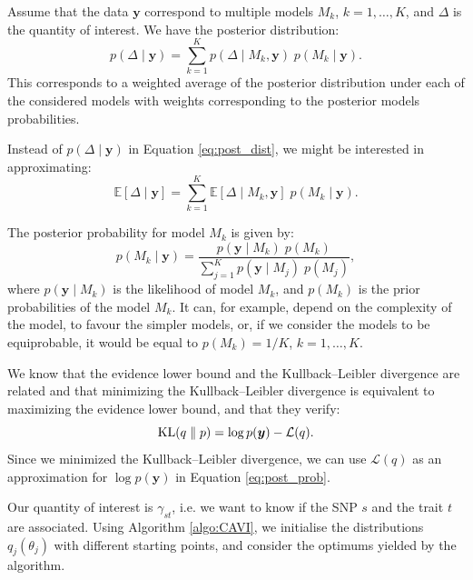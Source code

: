 \documentclass[a4paper, 11pt]{report}
\numberwithin{equation}{chapter}
\DeclareMathOperator*{\KL}{{\rm KL}}
\begin{document}
Assume that the data $\boldsymbol{y}$ correspond to multiple models $M_k$, $k= 1,\ldots,K$, and $\Delta$ is the quantity of interest. We have the posterior distribution:
\begin{equation}
p(\Delta \mid \boldsymbol{y}) = \sum_{k=1}^K p(\Delta \mid M_k,\boldsymbol{y}) \; p(M_k \mid \boldsymbol{y}).
\label{eq:post_dist}
\end{equation}
This corresponds to a weighted average of the posterior distribution under each of the considered models with weights corresponding to the posterior models probabilities.

Instead of $p(\Delta \mid \boldsymbol{y})$ in Equation \ref{eq:post_dist}, we might be interested in approximating:
\begin{equation*}
\mathbb{E}\left[\Delta \mid \boldsymbol{y}\right] = \sum_{k=1}^K\mathbb{E}\left[\Delta \mid M_k, \boldsymbol{y}\right]\;p(M_k \mid \boldsymbol{y}).
\end{equation*}

The posterior probability for model $M_k$ is given by:
\begin{equation}
p(M_k \mid \boldsymbol{y}) = \frac{p(\boldsymbol{y} \mid M_k)\; p(M_k)}{\sum_{j=1}^K p(\boldsymbol{y} \mid M_j)\; p(M_j)},
\label{eq:post_prob}
\end{equation}
where $p(\boldsymbol{y} \mid M_k)$ is the likelihood of model $M_k$, and $p(M_k)$ is the prior probabilities of the model $M_k$. It can, for example, depend on the complexity of the model, to favour the simpler models, or, if we consider the models to be equiprobable, it would be equal to $p(M_k) = 1/K$, $k = 1,\ldots,K$.  

We know that the evidence lower bound and the Kullback--Leibler divergence are related and that minimizing the Kullback--Leibler divergence is equivalent to maximizing the evidence lower bound, and that they verify: 
\begin{equation*}
\KL(q\parallel p) = \log p (\boldsymbol{y}) - \mathcal{L}(q).
\end{equation*}
Since we minimized the Kullback--Leibler divergence, we can use $\mathcal{L}(q)$ as an approximation for $\log p(\boldsymbol{y})$ in Equation \ref{eq:post_prob}.

Our quantity of interest is $\gamma_{st}$, i.e. we want to know if the SNP $s$ and the trait $t$ are associated. Using Algorithm \ref{algo:CAVI}, we initialise the distributions $q_j(\theta_j)$ with different starting points, and consider the optimums yielded by the algorithm.
\end{document}

